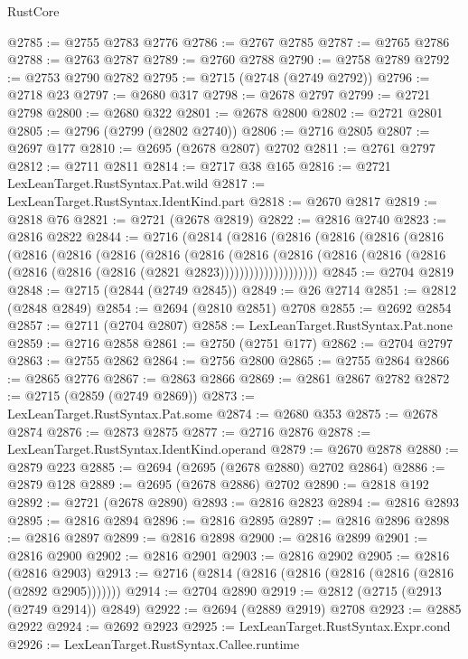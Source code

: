 \begin{lexlean}{RustCore}
\begin{coremodule}
@2785 := @2755 @2783 @2776
@2786 := @2767 @2785
@2787 := @2765 @2786
@2788 := @2763 @2787
@2789 := @2760 @2788
@2790 := @2758 @2789
@2792 := @2753 @2790 @2782
@2795 := @2715 (@2748 (@2749 @2792))
@2796 := @2718 @23
@2797 := @2680 @317
@2798 := @2678 @2797
@2799 := @2721 @2798
@2800 := @2680 @322
@2801 := @2678 @2800
@2802 := @2721 @2801
@2805 := @2796 (@2799 (@2802 @2740))
@2806 := @2716 @2805
@2807 := @2697 @177
@2810 := @2695 (@2678 @2807) @2702
@2811 := @2761 @2797
@2812 := @2711 @2811
@2814 := @2717 @38 @165
@2816 := @2721 LexLeanTarget.RustSyntax.Pat.wild
@2817 := LexLeanTarget.RustSyntax.IdentKind.part
@2818 := @2670 @2817
@2819 := @2818 @76
@2821 := @2721 (@2678 @2819)
@2822 := @2816 @2740
@2823 := @2816 @2822
@2844 := @2716
    (@2814
      (@2816
        (@2816
          (@2816
            (@2816
              (@2816
                (@2816
                  (@2816
                    (@2816
                      (@2816
                        (@2816
                          (@2816
                            (@2816
                              (@2816
                                (@2816 (@2816 (@2816 (@2816 (@2816 (@2821 @2823))))))))))))))))))))
@2845 := @2704 @2819
@2848 := @2715 (@2844 (@2749 @2845))
@2849 := @26 @2714
@2851 := @2812 (@2848 @2849)
@2854 := @2694 (@2810 @2851) @2708
@2855 := @2692 @2854
@2857 := @2711 (@2704 @2807)
@2858 := LexLeanTarget.RustSyntax.Pat.none
@2859 := @2716 @2858
@2861 := @2750 (@2751 @177)
@2862 := @2704 @2797
@2863 := @2755 @2862
@2864 := @2756 @2800
@2865 := @2755 @2864
@2866 := @2865 @2776
@2867 := @2863 @2866
@2869 := @2861 @2867 @2782
@2872 := @2715 (@2859 (@2749 @2869))
@2873 := LexLeanTarget.RustSyntax.Pat.some
@2874 := @2680 @353
@2875 := @2678 @2874
@2876 := @2873 @2875
@2877 := @2716 @2876
@2878 := LexLeanTarget.RustSyntax.IdentKind.operand
@2879 := @2670 @2878
@2880 := @2879 @223
@2885 := @2694 (@2695 (@2678 @2880) @2702 @2864)
@2886 := @2879 @128
@2889 := @2695 (@2678 @2886) @2702
@2890 := @2818 @192
@2892 := @2721 (@2678 @2890)
@2893 := @2816 @2823
@2894 := @2816 @2893
@2895 := @2816 @2894
@2896 := @2816 @2895
@2897 := @2816 @2896
@2898 := @2816 @2897
@2899 := @2816 @2898
@2900 := @2816 @2899
@2901 := @2816 @2900
@2902 := @2816 @2901
@2903 := @2816 @2902
@2905 := @2816 (@2816 @2903)
@2913 := @2716 (@2814 (@2816 (@2816 (@2816 (@2816 (@2816 (@2892 @2905)))))))
@2914 := @2704 @2890
@2919 := @2812 (@2715 (@2913 (@2749 @2914)) @2849)
@2922 := @2694 (@2889 @2919) @2708
@2923 := @2885 @2922
@2924 := @2692 @2923
@2925 := LexLeanTarget.RustSyntax.Expr.cond
@2926 := LexLeanTarget.RustSyntax.Callee.runtime

\end{coremodule}
\end{lexlean}
